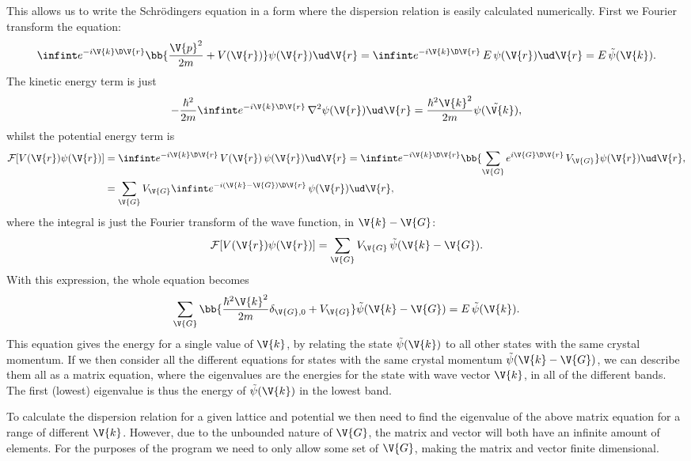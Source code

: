 \documentclass[main.tex]{subfiles}
\begin{document}
	
	This allows us to write the Schrödingers equation in a form where the dispersion relation is easily calculated numerically. First we Fourier transform the equation:
	\begin{equation}
		\infint e^{-i \V{k} \D \V{r}} \bb{\frac{\V{p}^2}{2m} + V(\V{r})}\psi(\V{r}) \ud \V{r}= \infint e^{-i\V{k} \D \V{r}}\, E\, \psi(\V{r}) \ud \V{r} = E \,\tilde{\psi}(\V{k}).
	\end{equation}
	The kinetic energy term is just
	\begin{equation}
		-\frac{\hbar^2}{2m}\infint e^{-i \V{k} \D \V{r}}\, \nabla^2\psi(\V{r}) \ud \V{r} = \frac{\hbar^2 \V{k}^2}{2m}\tilde{\psi(\V{k})},
	\end{equation}
	whilst the potential energy term is
	\begin{align}
		\mathcal{F}[V(\V{r}) \psi(\V{r})] &= \infint e^{-i \V{k} \D \V{r}}\, V(\V{r})\, \psi(\V{r}) \ud \V{r} = \infint e^{-i \V{k}\D \V{r}} \bb{\sum_{\V{G}} e^{i \V{G} \D \V{r}}\, V_{\V{G}} }\psi (\V{r}) \ud \V{r}, \\
		&= \sum_{\V{G}} V_{\V{G}} \infint e^{-i(\V{k}-\V{G})\D \V{r}}\, \psi(\V{r}) \ud \V{r},
	\end{align}
	where the integral is just the Fourier transform of the wave function, in $ \V{k}-\V{G} $:
	\begin{equation}
		\mathcal{F}[V(\V{r}) \psi(\V{r})] = \sum_{\V{G}} V_{\V{G}} \, \tilde{\psi}(\V{k}-\V{G}).
	\end{equation}
	With this expression, the whole equation becomes
	\begin{equation}
		\sum_{\V{G}} \bb{\frac{\hbar^2 \V{k}^2}{2m} \delta_{\V{G},0} + V_{\V{G}} } \tilde{\psi}(\V{k}-\V{G}) = E\, \tilde{\psi}(\V{k}).
	\end{equation}
	This equation gives the energy for a single value of $ \V{k} $, by relating the state $ \tilde{\psi}(\V{k}) $ to all other states with the same crystal momentum. If we then consider all the different equations for states with the same crystal momentum $ \tilde{\psi} (\V{k}-\V{G}) $, we can describe them all as a matrix equation, where the eigenvalues are the energies for the state with wave vector $ \V{k} $, in all of the different bands. The first (lowest) eigenvalue is thus the energy of $ \tilde{\psi} (\V{k}) $ in the lowest band.
	
	To calculate the dispersion relation for a given lattice and potential we then need to find the eigenvalue of the above matrix equation for a range of different $ \V{k} $. However, due to the unbounded nature of $ \V{G} $, the matrix and vector will both have an infinite amount of elements. For the purposes of the program we need to only allow some set of $ \V{G} $, making the matrix and vector finite dimensional.
	
\end{document}
